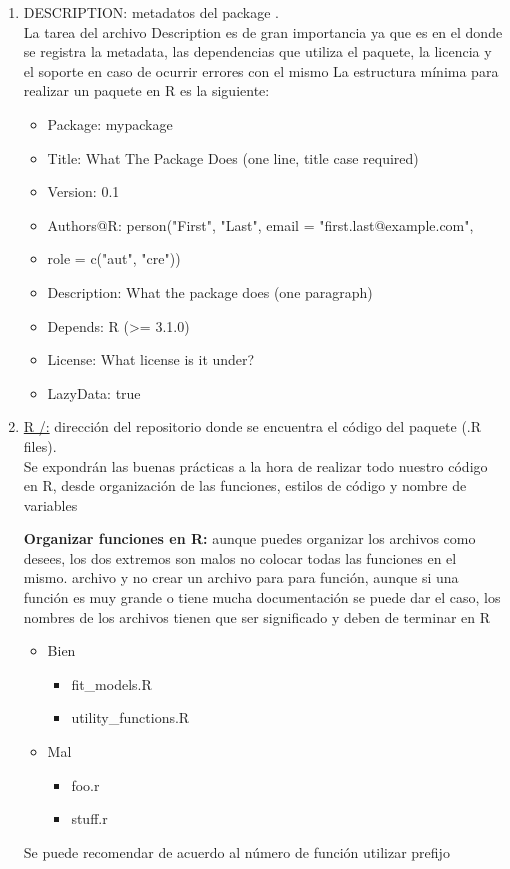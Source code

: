 \begin{enumerate}
  \item  DESCRIPTION: metadatos del package .\\
La tarea del archivo Description es de gran importancia ya que es en el donde se registra la metadata, las dependencias que utiliza el paquete, la licencia y el soporte en caso de ocurrir errores con el mismo
La estructura mínima para realizar un paquete en R es la siguiente:

\begin{itemize}
\item Package: mypackage
\item Title: What The Package Does (one line, title case required)
\item Version: 0.1
\item Authors@R: person("First", "Last", email = "first.last@example.com",
\item role = c("aut", "cre"))
\item Description: What the package does (one paragraph)
\item Depends: R (>= 3.1.0)
\item License: What license is it under?
\item LazyData: true
\end{itemize}
  \item \url{R /:} dirección del repositorio donde se encuentra el código del paquete (.R files).\\
Se expondrán las buenas prácticas a la hora de realizar todo nuestro código en R, desde organización de las funciones, estilos de código y nombre de variables 

\textbf{Organizar funciones en R:} aunque puedes organizar los archivos como desees, los dos extremos son malos no colocar todas las funciones en el mismo. archivo y no crear un archivo para para función, aunque si una función es muy grande o tiene mucha documentación se puede dar el caso, los nombres de los archivos tienen que ser significado y deben de terminar en R
\begin{itemize}
\item Bien  
\begin{itemize}
     \item fit\_models.R
     \item utility\_functions.R
  \end{itemize}
\item Mal
   \begin{itemize}
      \item foo.r
      \item stuff.r
    \end{itemize}
 \end{itemize}
Se puede recomendar de acuerdo al número de función utilizar prefijo 


\end{enumerate}
